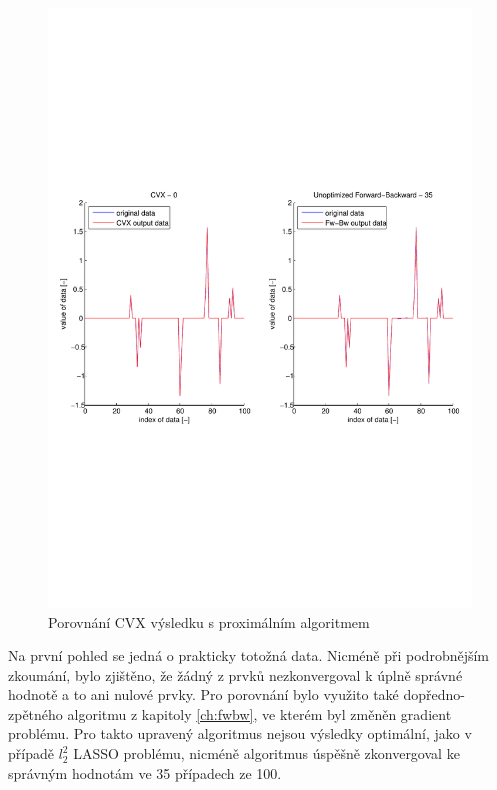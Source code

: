 \documentclass[FM,BP]{tulthesis}
\begin{document}
\begin{figure}[!ht]
	\begin{center}
		\includegraphics[scale=0.53]{obr/cvxvsprox.pdf}
	\end{center}
	\caption{Porovnání CVX výsledku s proximálním algoritmem}
	\label{fig:cvx}
\end{figure} 

Na první pohled se jedná o prakticky totožná data. Nicméně při podrobnějším zkoumání, bylo zjištěno, že žádný z prvků nezkonvergoval k úplně správné hodnotě a to ani nulové prvky. Pro porovnání bylo využito také dopředno-zpětného algoritmu z kapitoly \ref{ch:fwbw}, ve kterém byl změněn gradient problému. Pro takto upravený algoritmus nejsou výsledky optimální, jako v případě $l_{2}^{2}$ LASSO problému, nicméně algoritmus úspěšně zkonvergoval ke správným hodnotám ve 35 případech ze 100.
\end{document}
